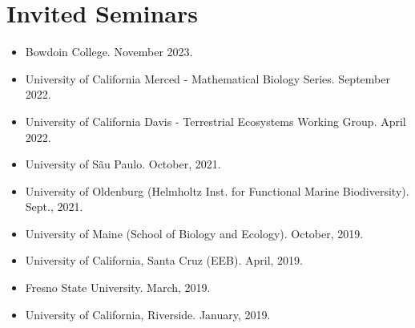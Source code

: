 \documentclass[margin,line,12pt]{res}
\begin{document}
\begin{resume}
\begin{itemize}
\end{itemize}


\section{\sc Invited Seminars}
\begin{itemize}

\item Bowdoin College. November 2023.

\item University of California Merced - Mathematical Biology Series. September 2022.

\item University of California Davis - Terrestrial Ecosystems Working Group. April 2022.

\item University of S\~au Paulo. October, 2021.

\item University of Oldenburg (Helmholtz Inst. for Functional Marine Biodiversity). Sept., 2021.

\item University of Maine (School of Biology and Ecology). October, 2019.

\item University of California, Santa Cruz (EEB). April, 2019.

\item Fresno State University. March, 2019.

\item University of California, Riverside. January, 2019.


\end{itemize}
\end{resume}
\end{document}
